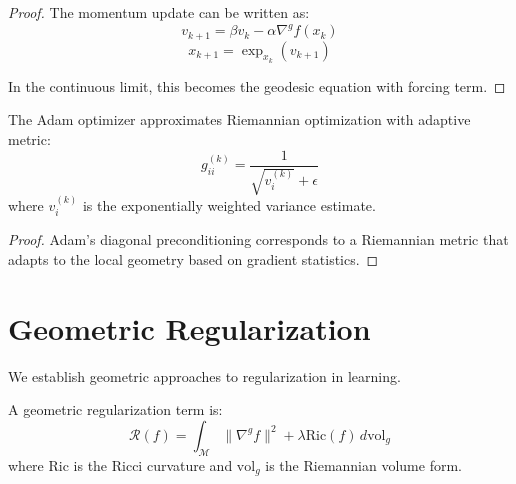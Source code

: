 \begin{proof}
The momentum update can be written as:
$$v_{k+1} = \beta v_k - \alpha \nabla^g f(x_k)$$
$$x_{k+1} = \exp_{x_k}(v_{k+1})$$

In the continuous limit, this becomes the geodesic equation with forcing term.
\end{proof}

\begin{theorem}
\label{thm:adam_adaptive_metric}
The Adam optimizer approximates Riemannian optimization with adaptive metric:
$$g_{ii}^{(k)} = \frac{1}{\sqrt{v_i^{(k)}} + \epsilon}$$
where $v_i^{(k)}$ is the exponentially weighted variance estimate.
\end{theorem}

\begin{proof}
Adam's diagonal preconditioning corresponds to a Riemannian metric that adapts to the local geometry based on gradient statistics.
\end{proof}

\section{Geometric Regularization}

We establish geometric approaches to regularization in learning.

\begin{definition}
\label{def:geometric_regularization}
A geometric regularization term is:
$$\mathcal{R}(f) = \int_{\mathcal{M}} \|\nabla^g f\|^2 + \lambda \text{Ric}(f) \, d\text{vol}_g$$
where $\text{Ric}$ is the Ricci curvature and $\text{vol}_g$ is the Riemannian volume form.
\end{definition}

